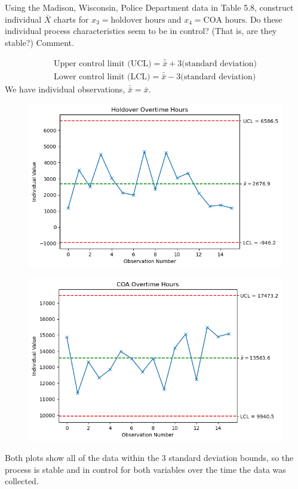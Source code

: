 Using the Madison, Wisconsin, Police Department data in Table 5.8, construct individual
$\bar{X}$ charts for $x_{3} = \text{holdover hours}$ and $x_{4} = \text{COA hours}$. Do these individual process
characteristics seem to be in control? (That is, are they stable?) Comment.

\begin{align*}
    \text{Upper control limit (UCL)} = \bar{\bar{x}} + \text{3(standard deviation)} \\
    \text{Lower control limit (LCL)} = \bar{\bar{x}} - \text{3(standard deviation)}
\end{align*}
We have individual observations, $\bar{\bar{x}} = \bar{x}$.

\begin{figure}[H]
    \centering
    \includegraphics[scale=0.65]{./python/chapter-5/Question-5-24-Holdover.png}
\end{figure}

\begin{figure}[H]
    \centering
    \includegraphics[scale=0.65]{./python/chapter-5/Question-5-24-COA.png}
\end{figure}

Both plots show all of the data within the 3 standard deviation bounds, so the process is stable and in control for both variables over the time the data was collected.